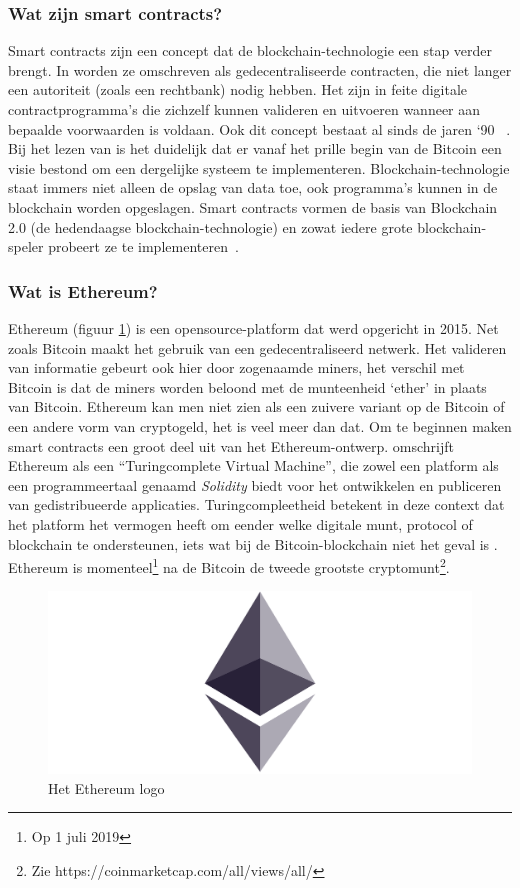 		\subsubsection{Wat  zijn smart contracts?}
			Smart contracts zijn een concept dat de blockchain-technologie een stap verder brengt. In \textcite{Swan2015} worden ze omschreven als gedecentraliseerde contracten, die niet langer een autoriteit (zoals een rechtbank) nodig hebben. Het zijn in feite digitale contractprogramma’s die zichzelf kunnen valideren en uitvoeren wanneer aan bepaalde voorwaarden is voldaan. Ook dit concept bestaat al sinds de jaren `90 ~\autocite{Szabo1996}. Bij het lezen van \textcite{Nakamoto2008} is het duidelijk dat er vanaf het prille begin van de Bitcoin een visie bestond om een dergelijke systeem te implementeren. Blockchain-technologie staat immers niet alleen de opslag van data toe, ook programma’s kunnen in de blockchain worden opgeslagen. Smart contracts vormen de basis van Blockchain 2.0 (de hedendaagse blockchain-technologie) en zowat iedere grote blockchain-speler probeert ze te implementeren~\autocite{Swan2015}.
		\subsubsection{Wat is Ethereum?}
			Ethereum (figuur \ref{fig:ethereum}) is een opensource-platform dat werd opgericht in 2015. Net zoals Bitcoin maakt het gebruik van een gedecentraliseerd netwerk. Het valideren van informatie gebeurt ook hier door zogenaamde miners, het verschil met Bitcoin is dat de miners worden beloond met de munteenheid `ether' in plaats van Bitcoin. Ethereum kan men niet zien als een zuivere variant op de Bitcoin of een andere vorm van cryptogeld, het is veel meer dan dat. Om te beginnen maken smart contracts  een groot deel uit van het Ethereum-ontwerp. \textcite{Swan2015} omschrijft Ethereum als een ``Turingcomplete Virtual Machine”, die zowel een platform als een programmeertaal genaamd \textit{Solidity} biedt voor het ontwikkelen en publiceren van gedistribueerde applicaties. Turingcompleetheid betekent in deze context dat het platform het vermogen heeft om eender welke digitale munt, protocol of blockchain te ondersteunen, iets wat bij de Bitcoin-blockchain niet het geval is \autocite{Swan2015}. Ethereum is momenteel\footnote{Op 1 juli 2019} na de Bitcoin de tweede grootste cryptomunt\footnote{Zie https://coinmarketcap.com/all/views/all/}. 
			
			\begin{figure}
				\centering
				\includegraphics[width=\linewidth/2]{img/ethereum.png}
				\caption{Het Ethereum logo ~\autocite{Peyrott2017}}
				\label{fig:ethereum}
			\end{figure}
			
